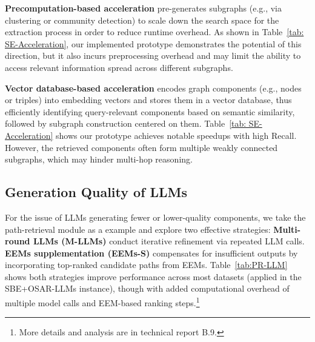 {\bf Precomputation-based acceleration} pre-generates subgraphs (e.g., via clustering or community detection) to scale down the search space for the extraction process in order to reduce runtime overhead. 
As shown in Table~\ref{tab: SE-Acceleration}, our implemented prototype demonstrates the potential of this direction, but it also incurs preprocessing overhead and may limit the ability to access relevant information spread across different subgraphs.



{\bf Vector database-based acceleration} encodes graph components (e.g., nodes or triples) into embedding vectors and stores them in a vector database, thus efficiently identifying query-relevant components based on semantic similarity, followed by subgraph construction centered on them. 
Table~\ref{tab: SE-Acceleration} shows our prototype achieves notable speedups with high Recall. However, the retrieved components often form multiple weakly connected subgraphs, which may hinder multi-hop reasoning.




\subsection{Generation Quality of LLMs}
\label{subsec:LLMsQ}



For the issue of LLMs generating fewer or lower-quality components, we take the path-retrieval module as a example and explore two effective strategies: {\bf Multi-round LLMs (M-LLMs)} 
conduct iterative refinement via repeated LLM calls.
{\bf EEMs supplementation (EEMs-S)} compensates for insufficient outputs by incorporating top-ranked candidate paths from EEMs. %
Table~\ref{tab:PR-LLM} shows both strategies improve performance across most datasets (applied in the SBE+OSAR-LLMs instance), though with added computational overhead of multiple model calls and EEM-based ranking steps.\footnote{More details and analysis are in technical report B.9. }